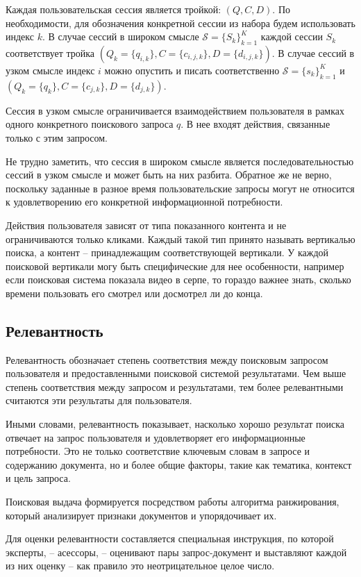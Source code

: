\documentclass[diploma]{nanolab2015}
\begin{document}
Каждая пользовательская сессия является тройкой: $(Q, C, D)$. По необходимости, для обозначения конкретной сессии из набора будем использовать индекс $k$. В случае сессий в широком смысле $\mathcal{S} = \{S_k\}_{k=1}^K$ каждой сессии $S_k$ соответствует тройка $(Q_{k} = \{q_{i,k}\}, C = \{c_{i,j,k}\}, D = \{d_{i,j,k}\})$. В случае сессий в узком смысле индекс $i$ можно опустить и писать соответственно $\mathcal{S} = \{s_k\}_{k=1}^K$ и $(Q_{k} = \{q_{k}\}, C = \{c_{j,k}\}, D = \{d_{j,k}\})$.

Сессия в узком смысле ограничивается взаимодействием пользователя в рамках одного конкретного поискового запроса $q$. В нее входят действия, связанные только с этим запросом.

Не трудно заметить, что сессия в широком смысле является последовательностью сессий в узком смысле и может быть на них разбита. Обратное же не верно, поскольку заданные в разное время пользовательские запросы могут не относится к удовлетворению его конкретной информационной потребности.

Действия пользователя зависят от типа показанного контента и не ограничиваются только кликами. Каждый такой тип принято называть вертикалью поиска, а контент -- принадлежащим соответствующей вертикали. У каждой поисковой вертикали могу быть специфические для нее особенности, например если поисковая система показала видео в серпе, то гораздо важнее знать, сколько времени пользовать его смотрел или досмотрел ли до конца.

\subsection{Релевантность}
Релевантность обозначает степень соответствия между поисковым запросом пользователя и предоставленными поисковой системой результатами. Чем выше степень соответствия между запросом и результатами, тем более релевантными считаются эти результаты для пользователя.

Иными словами, релевантность показывает, насколько хорошо результат поиска отвечает на запрос пользователя и удовлетворяет его информационные потребности. Это не только соответствие ключевым словам в запросе и содержанию документа, но и более общие факторы, такие как тематика, контекст и цель запроса.

Поисковая выдача формируется посредством работы алгоритма ранжирования, который анализирует признаки документов и упорядочивает их.

Для оценки релевантности составляется специальная инструкция, по которой эксперты, -- асессоры, -- оценивают пары запрос-документ и выставляют каждой из них оценку -- как правило это неотрицательное целое число.
\end{document}
